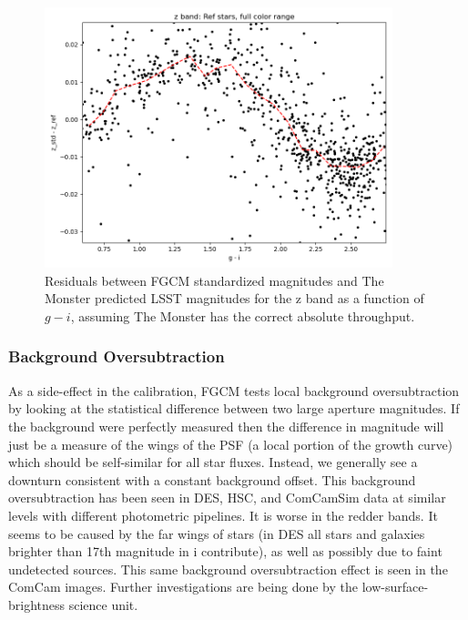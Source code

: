 \begin{figure}
  \begin{center}
    \includegraphics[width=0.9\textwidth]{photometric_calibration_figures/reference_residuals_z.png}
  \end{center}
  \caption{Residuals between FGCM standardized magnitudes and The Monster
    predicted LSST magnitudes for the z band as a function of $g-i$, assuming
    The Monster has the correct absolute throughput.}
\end{figure}

\subsubsection{Background Oversubtraction}

As a side-effect in the calibration, FGCM tests local background
oversubtraction by looking at the statistical difference between two large
aperture magnitudes.  If the background were perfectly measured then the
difference in magnitude will just be a measure of the wings of the PSF (a local
portion of the growth curve) which should be self-similar for all star fluxes.
Instead, we generally see a downturn consistent with a constant background
offset.  This background oversubtraction has been seen in DES, HSC, and
ComCamSim data at similar levels with different photometric pipelines.  It is
worse in the redder bands.  It seems to be caused by the far wings of stars (in
DES all stars and galaxies brighter than 17th magnitude in i contribute), as
well as possibly due to faint undetected sources.  This same background
oversubtraction effect is seen in the ComCam images.  Further investigations
are being done by the low-surface-brightness science unit.

